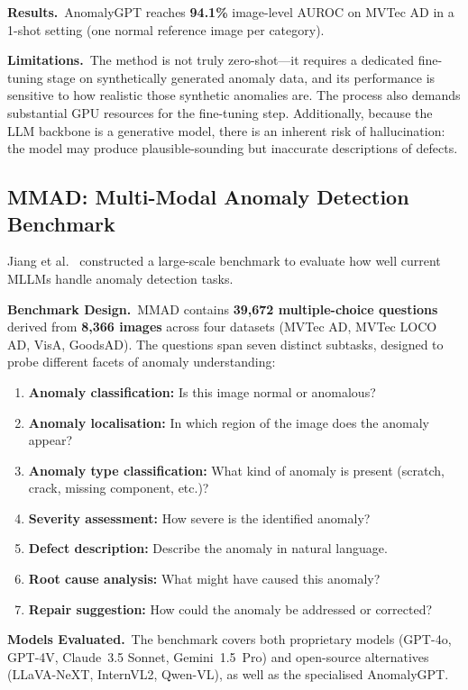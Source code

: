 \documentclass[conference]{IEEEtran}
\begin{document}
\textbf{Results.}\ AnomalyGPT reaches \textbf{94.1\%} image-level AUROC on MVTec AD in a 1-shot setting (one normal reference image per category).

\textbf{Limitations.}\ The method is not truly zero-shot---it requires a dedicated fine-tuning stage on synthetically generated anomaly data, and its performance is sensitive to how realistic those synthetic anomalies are. The process also demands substantial GPU resources for the fine-tuning step. Additionally, because the LLM backbone is a generative model, there is an inherent risk of hallucination: the model may produce plausible-sounding but inaccurate descriptions of defects.

\subsection{MMAD: Multi-Modal Anomaly Detection Benchmark}

Jiang et al.~\cite{jiang2025mmad} constructed a large-scale benchmark to evaluate how well current MLLMs handle anomaly detection tasks.

\textbf{Benchmark Design.}\ MMAD contains \textbf{39,672 multiple-choice questions} derived from \textbf{8,366 images} across four datasets (MVTec AD, MVTec LOCO AD, VisA, GoodsAD). The questions span seven distinct subtasks, designed to probe different facets of anomaly understanding:
\begin{enumerate}[leftmargin=*, itemsep=2pt]
    \item \textbf{Anomaly classification:} Is this image normal or anomalous?
    \item \textbf{Anomaly localisation:} In which region of the image does the anomaly appear?
    \item \textbf{Anomaly type classification:} What kind of anomaly is present (scratch, crack, missing component, etc.)?
    \item \textbf{Severity assessment:} How severe is the identified anomaly?
    \item \textbf{Defect description:} Describe the anomaly in natural language.
    \item \textbf{Root cause analysis:} What might have caused this anomaly?
    \item \textbf{Repair suggestion:} How could the anomaly be addressed or corrected?
\end{enumerate}

\textbf{Models Evaluated.}\ The benchmark covers both proprietary models (GPT-4o, GPT-4V, Claude~3.5 Sonnet, Gemini~1.5~Pro) and open-source alternatives (LLaVA-NeXT, InternVL2, Qwen-VL), as well as the specialised AnomalyGPT.
\end{document}
